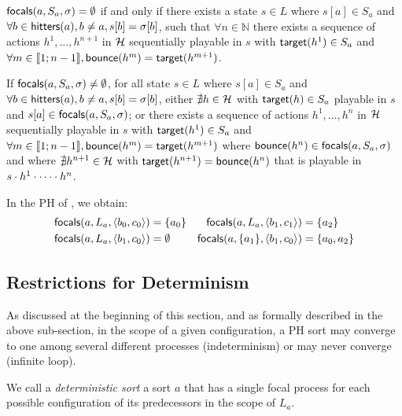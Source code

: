 \begin{property}
\label{pro:no-focals}
$\mathsf{focals}(a,S_a,\sigma)=\emptyset$ if and only if
there exists a 
state $s\in L$
where
$s[a]\in S_a$ and
$\forall b\in \mathsf{hitters}(a), b\neq a, s[b] = \sigma[b]$,
such that
$\forall n\in \mathbb N$
there 
exists a sequence of actions $h^1,\dots,h^{n+1}$ in $\mathcal{H}$
sequentially playable in $s$ with
$\mathsf{target}(h^1)\in S_a$ and
$\forall m\in\llbracket 1 ; n-1 \rrbracket, \mathsf{bounce}(h^m)=\mathsf{target}(h^{m+1})$.
\end{property}

\begin{property}
\label{pro:has-focals}
If $\mathsf{focals}(a,S_a,\sigma)\neq\emptyset$, for all
state $s\in L$
where
$s[a]\in S_a$ and
$\forall b\in \mathsf{hitters}(a), b\neq a, s[b] = \sigma[b]$,
either
$\nexists h\in\mathcal{H}$ with $\mathsf{target}(h)\in S_a$  playable in $s$ and
$s[a]\in\mathsf{focals}(a,S_a,\sigma)$;
or
there exists a sequence of actions $h^1,\dots,h^n$ in $\mathcal{H}$ sequentially playable in $s$ with
$\mathsf{target}(h^1)\in S_a$ and
$\forall m\in\llbracket 1 ; n-1 \rrbracket, \mathsf{bounce}(h^m)=\mathsf{target}(h^{m+1})$
where
 $\mathsf{bounce}(h^n) \in \mathsf{focals}(a,S_a,\sigma)$
 and
 where 
$\nexists h^{n+1}\in \mathcal{H}$ with $\mathsf{target}(h^{n+1})=\mathsf{bounce}(h^n)$ 
that is playable in $s\cdot h^1\cdot \cdots \cdot h^n$.
\end{property}



\begin{example}
In the PH of , we obtain:
\begin{align*}
\mathsf{focals}(a,L_a,\langle b_0,c_0 \rangle) &= \{ a_0 \}
&
\mathsf{focals}(a,L_a,\langle b_1,c_1 \rangle) &= \{ a_2 \}
\\
\mathsf{focals}(a,L_a,\langle b_1,c_0 \rangle) &= \emptyset
&
\mathsf{focals}(a,\{a_1\},\langle b_1,c_0 \rangle) &= \{ a_0, a_2 \}
\end{align*}
\end{example}

\subsection{Restrictions for Determinism} %
\label{ssec:dfocals}

As discussed at the beginning of this section, and as formally described in the above sub-section, 
in the scope of a given configuration,
a PH sort may converge to one among several different processes (indeterminism) or may never converge
(infinite loop).

We call a \emph{deterministic sort}  a sort $a$
that has a single focal process for each possible configuration of its predecessors in the scope of
$L_a$.

